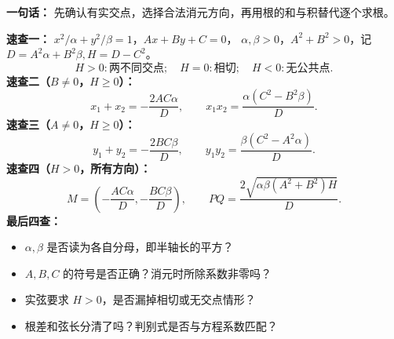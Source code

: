 \clearpage
\begin{summarybox}
\textbf{一句话：} 先确认有实交点，选择合法消元方向，再用根的和与积替代逐个求根。

\textbf{速查一：} $x^2/\alpha+y^2/\beta=1$，$Ax+By+C=0$，
$\alpha,\beta>0$，$A^2+B^2>0$，记 $D=A^2\alpha+B^2\beta,H=D-C^2$。
\[
 H>0:\text{两不同交点};\quad H=0:\text{相切};\quad H<0:\text{无公共点}.
\]
\textbf{速查二（$B\ne0$，$H\ge0$）：}
\[
 x_1+x_2=-\frac{2AC\alpha}{D},\qquad
 x_1x_2=\frac{\alpha(C^2-B^2\beta)}{D}.
\]
\textbf{速查三（$A\ne0$，$H\ge0$）：}
\[
 y_1+y_2=-\frac{2BC\beta}{D},\qquad
 y_1y_2=\frac{\beta(C^2-A^2\alpha)}{D}.
\]
\textbf{速查四（$H>0$，所有方向）：}
\[
 M=\left(-\frac{AC\alpha}{D},-\frac{BC\beta}{D}\right),\qquad
 PQ=\frac{2\sqrt{\alpha\beta(A^2+B^2)H}}{D}.
\]
\textbf{最后四查：}
\begin{itemize}[leftmargin=*]
\item $\alpha,\beta$ 是否读为各自分母，即半轴长的平方？
\item $A,B,C$ 的符号是否正确？消元时所除系数非零吗？
\item 实弦要求 $H>0$，是否漏掉相切或无交点情形？
\item 根差和弦长分清了吗？判别式是否与方程系数匹配？
\end{itemize}
\end{summarybox}
